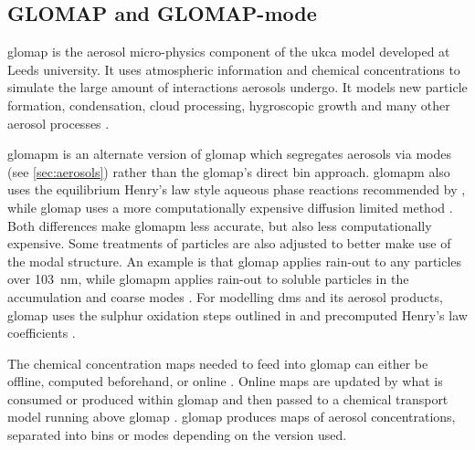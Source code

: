 
	\subsection{GLOMAP and GLOMAP-mode}
	\label{subsec:glomap}

	\gls{glomap} is the aerosol micro-physics component of the \gls{ukca} model developed at Leeds university. It uses atmospheric information and chemical concentrations to simulate the large amount of interactions aerosols undergo. It models new particle formation, condensation, cloud processing, hygroscopic growth and many other aerosol processes \citep{mann:2010wb}.

	\gls{glomapm} is an alternate version of \gls{glomap} which segregates aerosols via modes (see \cref{sec:aerosols}) rather than the \gls{glomap}'s direct bin approach. \gls{glomapm} also uses the equilibrium Henry's law style aqueous phase reactions recommended by \citet{barnes:2006ug}, while \gls{glomap} uses a more computationally expensive diffusion limited method \citep{mann:2010wb}. Both differences make \gls{glomapm} less accurate, but also less computationally expensive. Some treatments of particles are also adjusted to better make use of the modal structure. An example is that \gls{glomap} applies rain-out to any particles over \SI{103}{\nm}, while \gls{glomapm} applies rain-out to soluble particles in the accumulation and coarse modes \citep{mann:2010wb}. For modelling \gls{dms} and its aerosol products, \gls{glomap} uses the sulphur oxidation steps outlined in \citet{seinfeld2012atmospheric} and precomputed Henry's law coefficients \citep{mann:2010wb}. 

	The chemical concentration maps needed to feed into \gls{glomap} can either be offline, computed beforehand, or online \citep{mann:2010wb}. Online maps are updated by what is consumed or produced within \gls{glomap} and then passed to a chemical transport model running above \gls{glomap} \citep{spracklen2003development}. \gls{glomap} produces maps of aerosol concentrations, separated into bins or modes depending on the version used.


